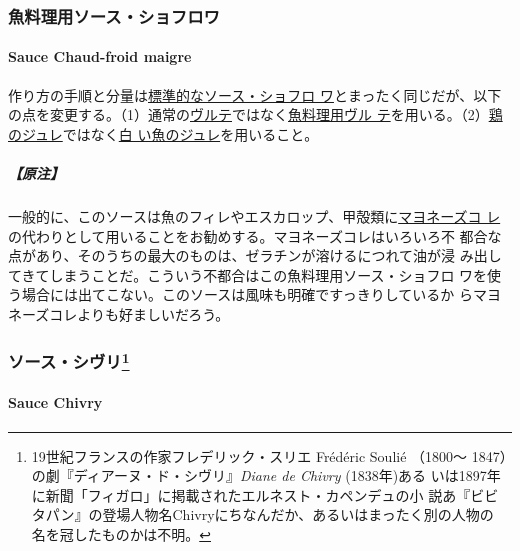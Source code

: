 \begin{recette}
\maeaki

\hypertarget{ux9b5aux6599ux7406ux7528ux30bdux30fcux30b9ux30b7ux30e7ux30d5ux30edux30ef}{%
\subsubsection{魚料理用ソース・ショフロワ}\label{ux9b5aux6599ux7406ux7528ux30bdux30fcux30b9ux30b7ux30e7ux30d5ux30edux30ef}}

\hypertarget{sauce-chaud-froid-maigre}{%
\paragraph{Sauce Chaud-froid maigre}\label{sauce-chaud-froid-maigre}}

作り方の手順と分量は\protect\hyperlink{sauce-chaud-froid-blanche-ordinaire}{標準的なソース・ショフロ
ワ}とまったく同じだが、以下
の点を変更する。（1）通常の\protect\hyperlink{veloute}{ヴルテ}ではなく\protect\hyperlink{veloute-de-poisson}{魚料理用ヴル
テ}を用いる。（2）\protect\hyperlink{}{鶏のジュレ}ではなく\protect\hyperlink{}{白
い魚のジュレ}を用いること。

\hypertarget{ux539fux6ce8-4}{%
\subparagraph{【原注】}\label{ux539fux6ce8-4}}

一般的に、このソースは魚のフィレやエスカロップ、甲殻類に\protect\hyperlink{}{マヨネーズコ
レ}の代わりとして用いることをお勧めする。マヨネーズコレはいろいろ不
都合な点があり、そのうちの最大のものは、ゼラチンが溶けるにつれて油が浸
み出してきてしまうことだ。こういう不都合はこの魚料理用ソース・ショフロ
ワを使う場合には出てこない。このソースは風味も明確ですっきりしているか
らマヨネーズコレよりも好ましいだろう。

\maeaki

\hypertarget{ux30bdux30fcux30b9ux30b7ux30f4ux30ea33}{%
\subsubsection[ソース・シヴリ]{\texorpdfstring{ソース・シヴリ\footnote{19世紀フランスの作家フレデリック・スリエ
  Frédéric Soulié （1800〜
  1847）の劇『ディアーヌ・ド・シヴリ』\emph{Diane de Chivry}
  (1838年)ある
  いは1897年に新聞「フィガロ」に掲載されたエルネスト・カペンデュの小
  説あ『ビビタパン』の登場人物名Chivryにちなんだか、あるいはまったく別の人物の
  名を冠したものかは不明。}}{ソース・シヴリ}}\label{ux30bdux30fcux30b9ux30b7ux30f4ux30ea33}}

\hypertarget{sacue-chivry}{%
\paragraph{Sauce Chivry}\label{sacue-chivry}}


\end{recette}

